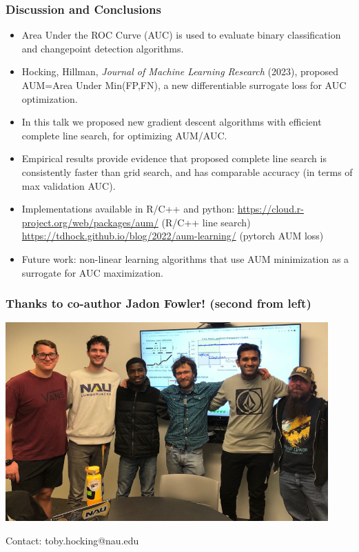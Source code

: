 \documentclass[t]{beamer}
\begin{document}
\begin{frame}
  \frametitle{Discussion and Conclusions}
  \begin{itemize}
  \item Area Under the ROC Curve (AUC) is used to evaluate binary
    classification and changepoint detection algorithms.
  \item Hocking, Hillman, \emph{Journal of Machine Learning Research}
    (2023), proposed AUM=Area Under Min(FP,FN), a new
    differentiable surrogate loss for AUC optimization.
  \item In this talk we proposed new gradient descent algorithms with
    efficient complete line search, for optimizing AUM/AUC.
  \item Empirical results provide evidence that proposed complete line
    search is consistently faster than grid search, and has 
    comparable accuracy (in terms of max validation AUC).
  \item Implementations available in R/C++ and python:
    {\scriptsize
    \url{https://cloud.r-project.org/web/packages/aum/} (R/C++ line search)
    \url{https://tdhock.github.io/blog/2022/aum-learning/} (pytorch AUM loss)
    }
  \item Future work: non-linear learning algorithms that use AUM
    minimization as a surrogate for AUC maximization.
  \end{itemize}
\end{frame}

\begin{frame}
  \frametitle{Thanks to co-author Jadon Fowler! (second from left)}

  \includegraphics[height=3in]{2023-02-02-group-meeting}

  Contact: toby.hocking@nau.edu

\end{frame}
\end{document}
